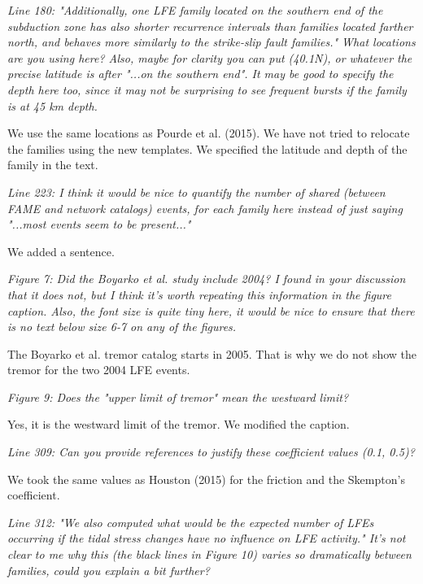 \documentclass[letterpaper, 12pt]{article}
\begin{document}
\textit{Line 180: "Additionally, one LFE family located on the southern end of the subduction zone has also shorter recurrence intervals than families located farther north, and behaves more similarly to the strike-slip fault families." What locations are you using here? Also, maybe for clarity you can put (40.1N), or whatever the precise latitude is after "...on the southern end". It may be good to specify the depth here too, since it may not be surprising to see frequent bursts if the family is at 45 km depth.}

\bigskip

We use the same locations as Pourde et al. (2015). We have not tried to relocate the families using the new templates. We specified the latitude and depth of the family in the text.

\bigskip

\textit{Line 223: I think it would be nice to quantify the number of shared (between FAME and network catalogs) events, for each family here instead of just saying "...most events seem to be present..."}

\bigskip

We added a sentence.

\bigskip

\textit{Figure 7: Did the Boyarko et al. study include 2004? I found in your discussion that it does not, but I think it's worth repeating this information in the figure caption. Also, the font size is quite tiny here, it would be nice to ensure that there is no text below size 6-7 on any of the figures.}

\bigskip

The Boyarko et al. tremor catalog starts in 2005. That is why we do not show the tremor for the two 2004 LFE events.

\bigskip

\textit{Figure 9: Does the "upper limit of tremor" mean the westward limit?}

\bigskip

Yes, it is the westward limit of the tremor. We modified the caption.

\bigskip

\textit{Line 309: Can you provide references to justify these coefficient values (0.1, 0.5)?}

\bigskip

We took the same values as Houston (2015) for the friction and the Skempton's coefficient.

\bigskip

\textit{Line 312: "We also computed what would be the expected number of LFEs occurring if the tidal stress changes have no influence on LFE activity." It's not clear to me why this (the black lines in Figure 10) varies so dramatically between families, could you explain a bit further?}
\end{document}
